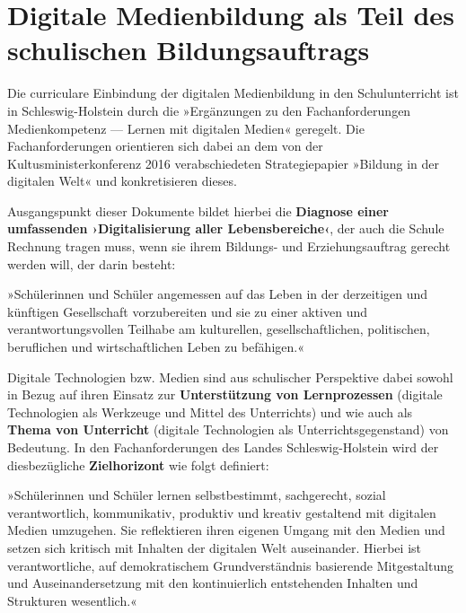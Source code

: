 \documentclass[
  a4paper,
]{book}
\begin{document}
\section{Digitale Medienbildung als Teil des schulischen Bildungsauftrags}\label{digitale-medienbildung-als-teil-des-schulischen-bildungsauftrags}

Die curriculare Einbindung der digitalen Medienbildung in den Schulunterricht ist in Schleswig-Holstein durch die »Ergänzungen zu den Fachanforderungen Medienkompetenz --- Lernen mit digitalen Medien« \citep{ministeriumfurbildungwissenschaftundkulturdeslandesschleswig-holsteinErganzungenFachanforderungenMedienkompetenz2018} geregelt. Die Fachanforderungen orientieren sich dabei an dem von der Kultusministerkonferenz 2016 verabschiedeten Strategiepapier »Bildung in der digitalen Welt« \citep{kultusministerkonferenzBildungDigitalenWelt2016} und konkretisieren dieses.

Ausgangspunkt dieser Dokumente bildet hierbei die \textbf{Diagnose einer umfassenden ›Digitalisierung aller Lebensbereiche‹}, der auch die Schule Rechnung tragen muss, wenn sie ihrem Bildungs- und Erziehungsauftrag gerecht werden will, der darin besteht:

{»Schülerinnen und Schüler angemessen auf das Leben in der derzeitigen und künftigen Gesellschaft vorzubereiten und sie zu einer aktiven und verantwortungsvollen Teilhabe am kulturellen, gesellschaftlichen, politischen, beruflichen und wirtschaftlichen Leben zu befähigen.« \citep[S. 10]{kultusministerkonferenzBildungDigitalenWelt2016}}

Digitale Technologien bzw. Medien sind aus schulischer Perspektive dabei sowohl in Bezug auf ihren Einsatz zur \textbf{Unterstützung von Lernprozessen} (digitale Technologien als Werkzeuge und Mittel des Unterrichts) und wie auch als \textbf{Thema von Unterricht} (digitale Technologien als Unterrichtsgegenstand) von Bedeutung. In den Fachanforderungen des Landes Schleswig-Holstein wird der diesbezügliche \textbf{Zielhorizont} wie folgt definiert:

{»Schülerinnen und Schüler lernen selbstbestimmt, sachgerecht, sozial verantwortlich, kommunikativ, produktiv und kreativ gestaltend mit digitalen Medien umzugehen. Sie reflektieren ihren eigenen Umgang mit den Medien und setzen sich kritisch mit Inhalten der digitalen Welt auseinander. Hierbei ist verantwortliche, auf demokratischem Grundverständnis basierende Mitgestaltung und Auseinandersetzung mit den kontinuierlich entstehenden Inhalten und Strukturen wesentlich.« \citep[S. 4]{ministeriumfurbildungwissenschaftundkulturdeslandesschleswig-holsteinErganzungenFachanforderungenMedienkompetenz2018}}
\end{document}
